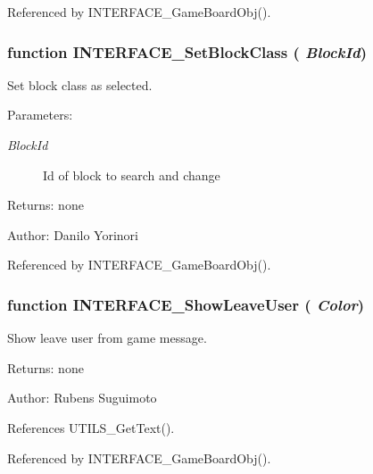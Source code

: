 Referenced by INTERFACE\_\-GameBoardObj().
\subsubsection[INTERFACE\_\-SetBlockClass]{\setlength{\rightskip}{0pt plus 5cm}function INTERFACE\_\-SetBlockClass ( {\em BlockId})}\label{board_8js_856486543b43b56c32d4c6b6680dada6}


Set block class as selected. 

\begin{Desc}
\item[Parameters:]
\begin{description}
\item[{\em BlockId}]Id of block to search and change \end{description}
\end{Desc}
\begin{Desc}
\item[Returns:]none \end{Desc}
\begin{Desc}
\item[Author:]Danilo Yorinori \end{Desc}


Referenced by INTERFACE\_\-GameBoardObj().
\subsubsection[INTERFACE\_\-ShowLeaveUser]{\setlength{\rightskip}{0pt plus 5cm}function INTERFACE\_\-ShowLeaveUser ( {\em Color})}\label{board_8js_0989815203860164c79efb02c8b840fd}


Show leave user from game message. 

\begin{Desc}
\item[Returns:]none \end{Desc}
\begin{Desc}
\item[Author:]Rubens Suguimoto \end{Desc}


References UTILS\_\-GetText().

Referenced by INTERFACE\_\-GameBoardObj().
